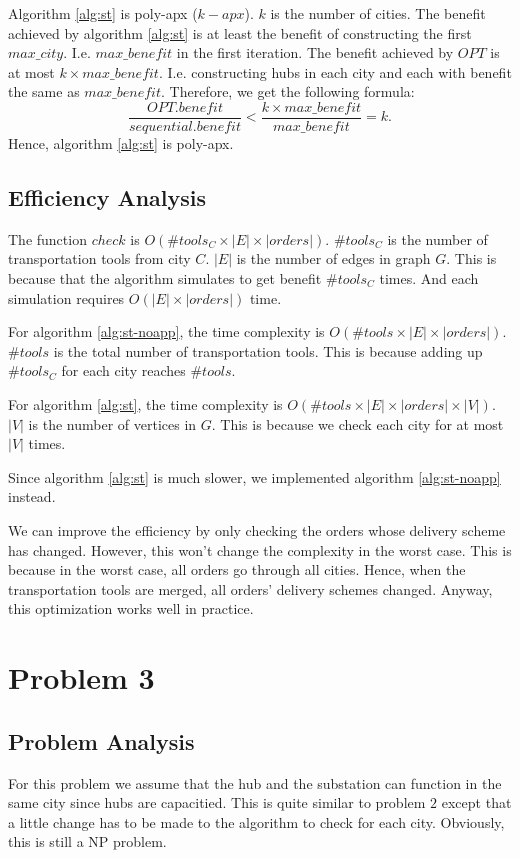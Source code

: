 \documentclass[11pt, a4paper]{article} %
\begin{document}
	Algorithm \ref{alg:st} is poly-apx ($k-apx$). $k$ is the number of cities. The benefit achieved by algorithm \ref{alg:st} is at least the benefit of constructing the first $max\_city$. I.e. $max\_benefit$ in the first iteration. The benefit achieved by $OPT$ is at most $k\times max\_benefit$. I.e. constructing hubs in each city and each with benefit the same as $max\_benefit$. Therefore, we get the following formula:
	$$
	\frac{OPT.benefit}{sequential.benefit}<\frac{k\times max\_benefit}{max\_benefit}=k.
	$$
	Hence, algorithm \ref{alg:st} is poly-apx.
	
	\subsection{Efficiency Analysis}\label{sec:2-E}
	The function $check$ is $O(\#tools_C\times |E|\times |orders|)$. $\#tools_C$ is the number of transportation tools from city $C$. $|E|$ is the number of edges in graph $G$. This is because that the algorithm simulates to get benefit $\#tools_C$ times. And each simulation requires $O(|E|\times |orders|)$ time.
	
	For algorithm \ref{alg:st-noapp}, the time complexity is $O(\#tools\times |E|\times |orders|)$. $\#tools$ is the total number of transportation tools. This is because adding up $\#tools_C$ for each city reaches $\#tools$. 
	
	For algorithm \ref{alg:st}, the time complexity is $O(\#tools\times |E|\times |orders| \times |V|)$. $|V|$ is the number of vertices in $G$. This is because we check each city for at most $|V|$ times.
	
	Since algorithm \ref{alg:st} is much slower, we implemented algorithm \ref{alg:st-noapp} instead.
	
	We can improve the efficiency by only checking the orders whose delivery scheme has changed. However, this won't change the complexity in the worst case. This is because in the worst case, all orders go through all cities. Hence, when the transportation tools are merged, all orders' delivery schemes changed. Anyway, this optimization works well in practice.

\section{Problem 3}
\subsection{Problem Analysis}
	For this problem we assume that the hub and the substation can function in the same city since hubs are capacitied. This is quite similar to problem $2$ except that a little change has to be made to the algorithm to check for each city. Obviously, this is still a NP problem.
\end{document}
